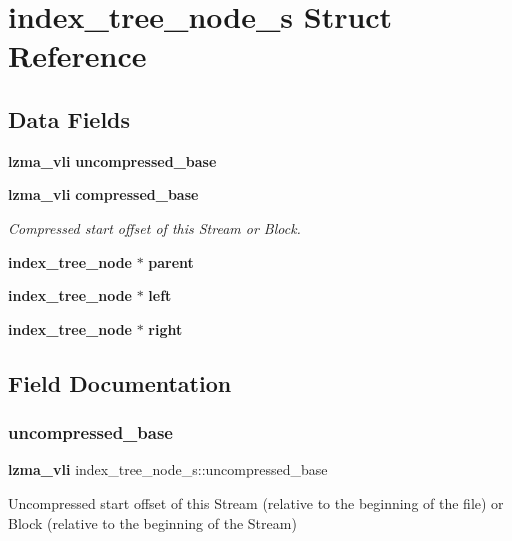 \section{index\+\_\+tree\+\_\+node\+\_\+s Struct Reference}
\label{structindex__tree__node__s}
\subsection*{Data Fields}
\begin{DoxyCompactItemize}
\item 
\textbf{ lzma\+\_\+vli} \textbf{ uncompressed\+\_\+base}
\item 
\textbf{ lzma\+\_\+vli} \textbf{ compressed\+\_\+base}
\begin{DoxyCompactList}\small\item\em Compressed start offset of this Stream or Block. \end{DoxyCompactList}\item 
\mbox{\label{structindex__tree__node__s_a6d682099a97742fde2b70dbb4043b943}} 
\textbf{ index\+\_\+tree\+\_\+node} $\ast$ {\bfseries parent}
\item 
\mbox{\label{structindex__tree__node__s_a638db95808d3748f92226352c7a62435}} 
\textbf{ index\+\_\+tree\+\_\+node} $\ast$ {\bfseries left}
\item 
\mbox{\label{structindex__tree__node__s_a481731822e8073ba8db151e7baa101cc}} 
\textbf{ index\+\_\+tree\+\_\+node} $\ast$ {\bfseries right}
\end{DoxyCompactItemize}


\subsection{Field Documentation}
\mbox{\label{structindex__tree__node__s_a16b23fdd5d86576ba3c8b0be7e693f0e}} 
\subsubsection{uncompressed\+\_\+base}
{\footnotesize\ttfamily \textbf{ lzma\+\_\+vli} index\+\_\+tree\+\_\+node\+\_\+s\+::uncompressed\+\_\+base}

Uncompressed start offset of this Stream (relative to the beginning of the file) or Block (relative to the beginning of the Stream) 

